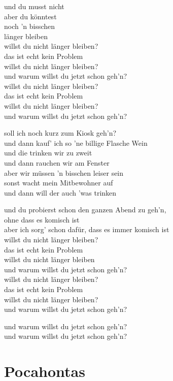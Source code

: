 \documentclass[]{book}
\begin{document}
und du musst nicht\\
aber du könntest\\
noch 'n bisschen\\
länger bleiben\\
willst du nicht länger bleiben?\\
das ist echt kein Problem\\
willst du nicht länger bleiben?\\
und warum willst du jetzt schon geh'n?\\
willst du nicht länger bleiben?\\
das ist echt kein Problem\\
willst du nicht länger bleiben?\\
und warum willst du jetzt schon geh'n?

soll ich noch kurz zum Kiosk geh'n?\\
und dann kauf' ich so 'ne billige Flasche Wein\\
und die trinken wir zu zweit\\
und dann rauchen wir am Fenster\\
aber wir müssen 'n bisschen leiser sein\\
sonst wacht mein Mitbewohner auf\\
und dann will der auch 'was trinken

und du probierst schon den ganzen Abend zu geh'n,\\
ohne dass es komisch ist\\
aber ich sorg' schon dafür, dass es immer komisch ist\\
willst du nicht länger bleiben?\\
das ist echt kein Problem\\
willst du nicht länger bleiben\\
und warum willst du jetzt schon geh'n?\\
willst du nicht länger bleiben?\\
das ist echt kein Problem\\
willst du nicht länger bleiben?\\
und warum willst du jetzt schon geh'n?

und warum willst du jetzt schon geh'n?\\
und warum willst du jetzt schon geh'n?

\hypertarget{pocahontas-1}{%
\section{Pocahontas}\label{pocahontas-1}}
\end{document}
